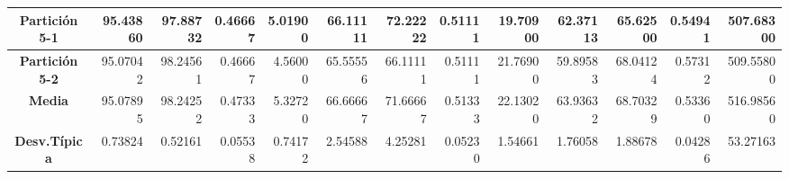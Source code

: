 \documentclass[a4paper,11pt]{article}
\begin{document}
\begin{table}[H]
\begin{adjustbox}{width=1.1\textwidth}
\begin{tabular}{|c|r|r|r|r|r|r|r|r|r|r|r|r|}
  \textbf{Partición 5-1} & 95.43860 & 97.88732 & 0.46667 & 5.01900 & 66.11111 & 72.22222 & 0.51111 & 19.70900 & 62.37113 & 65.62500 & 0.54941 & 507.68300 \\ \hline
  \textbf{Partición 5-2} & 95.07042 & 98.24561 & 0.46667 & 4.56000 & 65.55556 & 66.11111 & 0.51111 & 21.76900 & 59.89583 & 68.04124 & 0.57312 & 509.55800 \\ \hline
  \textbf{Media} & 95.07895 & 98.24252 & 0.47333 & 5.32720 & 66.66667 & 71.66667 & 0.51333 & 22.13020 & 63.93632 & 68.70329 & 0.53360 & 516.98560 \\ \hline
  \textbf{Desv.Típica} & 0.73824 & 0.52161 & 0.05538 & 0.74172 & 2.54588 & 4.25281 & 0.05230 & 1.54661 & 1.76058 & 1.88678 & 0.04286 & 53.27163 \\ \hline
  \end{tabular}
  \end{adjustbox}
  \label{BMB}
  \end{table}
\end{document}

